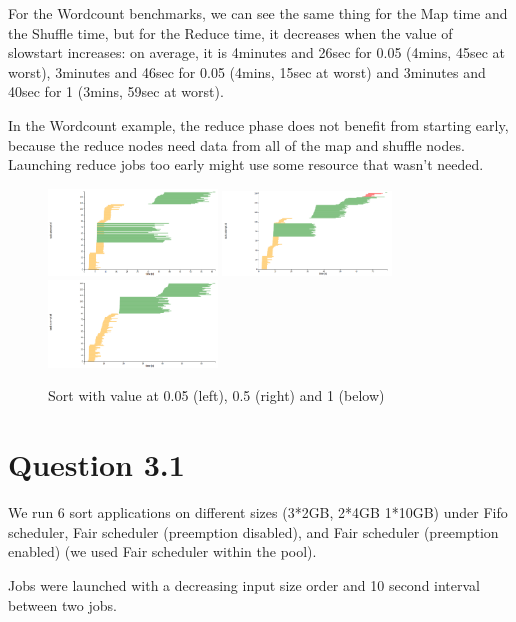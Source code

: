 \documentclass{article}
\begin{document}
For the Wordcount benchmarks, we can see the same thing for the Map time and the Shuffle time, but for the Reduce time, it decreases when the value of slowstart increases: on average, it is 4minutes and 26sec for 0.05 (4mins, 45sec at worst), 3minutes and 46sec for 0.05 (4mins, 15sec at worst) and 3minutes and 40sec for 1 (3mins, 59sec at worst).

In the Wordcount example, the reduce phase does not benefit from starting early, because the reduce nodes need data from all of the map and shuffle nodes. Launching reduce jobs too early might use some resource that wasn't needed. 


\begin{figure}%
  \centering
  \includegraphics[width=0.4\textwidth]{sort005.png}
  \includegraphics[width=0.4\textwidth]{sort05.png}
  \includegraphics[width=0.4\textwidth]{sort1.png}
  \caption{Sort with value at 0.05 (left), 0.5 (right) and 1 (below)}
  \label{values}
\end{figure}





\section*{Question 3.1}


We run 6 sort applications on different sizes (3*2GB, 2*4GB 1*10GB) under Fifo scheduler, Fair scheduler (preemption disabled), and Fair scheduler
(preemption enabled) (we used Fair scheduler within the pool).

Jobs were launched with a decreasing input size order and 10 second interval between two
jobs.
\end{document}
